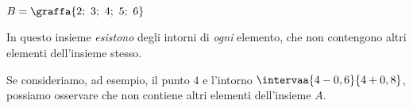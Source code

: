 \begin{esempio}
\item \(B=\graffa{2;~3;~4;~5;~6}\) 

In questo insieme \emph{esistono} degli intorni di \emph{ogni} elemento,
che non contengono altri elementi dell'insieme stesso.

Se consideriamo, ad esempio, il punto \(4\) e l'intorno 
\(\intervaa{4-0,6}{4+0,8}\), possiamo osservare che non contiene 
altri elementi dell'insieme \(A\).
\end{esempio}

% 
% 
% 
% 
% 

